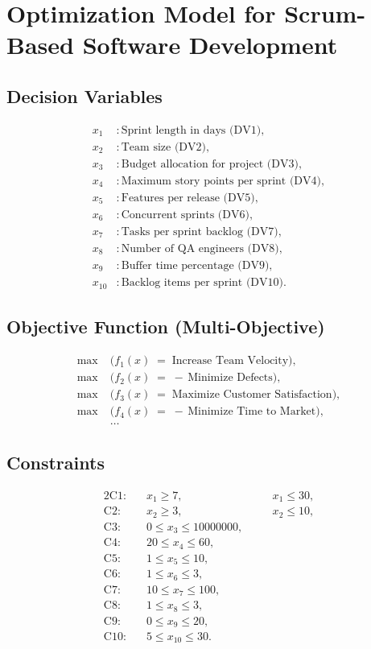 \documentclass{article}
\begin{document}
\section*{Optimization Model for Scrum-Based Software Development}

\subsection*{Decision Variables}
\begin{align*}
x_1 &: \text{Sprint length in days (DV1)}, \\
x_2 &: \text{Team size (DV2)}, \\
x_3 &: \text{Budget allocation for project (DV3)}, \\
x_4 &: \text{Maximum story points per sprint (DV4)}, \\
x_5 &: \text{Features per release (DV5)}, \\
x_6 &: \text{Concurrent sprints (DV6)}, \\
x_7 &: \text{Tasks per sprint backlog (DV7)}, \\
x_8 &: \text{Number of QA engineers (DV8)}, \\
x_9 &: \text{Buffer time percentage (DV9)}, \\
x_{10} &: \text{Backlog items per sprint (DV10)}.
\end{align*}

\subsection*{Objective Function (Multi-Objective)}
\begin{align*}
\max \; &\bigl(f_1(x) \;=\; \text{Increase Team Velocity}\bigr),\\
\max \; &\bigl(f_2(x) \;=\; -\,\text{Minimize Defects}\bigr),\\
\max \; &\bigl(f_3(x) \;=\; \text{Maximize Customer Satisfaction}\bigr),\\
\max \; &\bigl(f_4(x) \;=\; -\,\text{Minimize Time to Market}\bigr),\\
&\ldots
\end{align*}

\subsection*{Constraints}
\begin{alignat*}{2}
\text{C1:}&\quad x_1 \ge 7, &\quad &x_1 \le 30, \\
\text{C2:}&\quad x_2 \ge 3, &\quad &x_2 \le 10, \\
\text{C3:}&\quad 0 \le x_3 \le 10000000, \\
\text{C4:}&\quad 20 \le x_4 \le 60, \\
\text{C5:}&\quad 1 \le x_5 \le 10, \\
\text{C6:}&\quad 1 \le x_6 \le 3, \\
\text{C7:}&\quad 10 \le x_7 \le 100, \\
\text{C8:}&\quad 1 \le x_8 \le 3, \\
\text{C9:}&\quad 0 \le x_9 \le 20, \\
\text{C10:}&\quad 5 \le x_{10} \le 30.
\end{alignat*}
\end{document}
